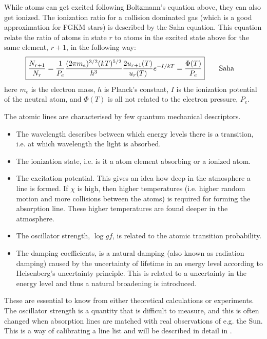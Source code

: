 While atoms can get excited following Boltzmann's equation above, they can also get ionized. The
ionization ratio for a collision dominated gas (which is a good approximation for FGKM stars) is
described by the Saha equation. This equation relate the ratio of atoms in state $r$ to atoms in the
excited state above for the same element, $r+1$, in the following way:
\begin{align}
  \Aboxed{ \frac{N_{r+1}}{N_r} = \frac{1}{P_e} \frac{(2\pi m_e)^{3/2}(kT)^{5/2}}{h^3} \frac{2u_{r+1}(T)}{u_r(T)} e^{-I/kT} = \frac{\Phi(T)}{P_e}} \tag*{Saha}
\end{align}
here $m_e$ is the electron mass, $h$ is Planck's constant, $I$ is the ionization potential of the
neutral atom, and $\Phi(T)$ is all not related to the electron pressure, $P_e$.

The atomic lines are characterised by few quantum mechanical descriptors.
\begin{itemize}
  \item The wavelength describes between which energy levels there is a transition, i.e. at which
        wavelength the light is absorbed.
  \item The ionization state, i.e. is it a atom element absorbing or a ionized atom.
  \item The excitation potential. This gives an idea how deep in the atmosphere a line is formed. If
        $\chi$ is high, then higher temperatures (i.e. higher random motion and more collisions
        between the atoms) is required for forming the absorption line. These higher temperatures
        are found deeper in the atmosphere.
  \item The oscillator strength, $\log \mathit{gf}$, is related to the atomic transition probability.
  \item The damping coefficients, is a natural damping (also known as radiation damping) caused by
        the uncertainty of lifetime in an energy level according to Heisenberg's uncertainty
        principle. This is related to a uncertainty in the energy level and thus a natural
        broadening is introduced.
\end{itemize}
These are essential to know from either theoretical calculations or experiments. The oscillator
strength is a quantity that is difficult to measure, and this is often changed when absorption lines
are matched with real observations of e.g. the Sun. This is a way of calibrating a line list and
will be described in detail in .

